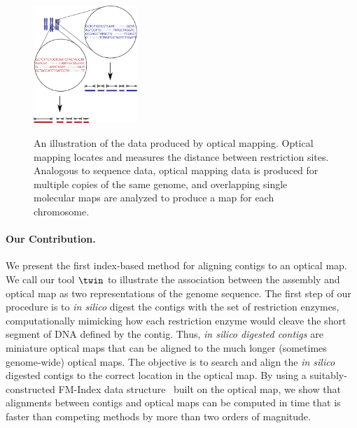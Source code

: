 \documentclass[doctor]{thesis}
\begin{document}
 \begin{figure}
   \centering
   \caption{An illustration of the data produced by optical mapping. Optical mapping locates and measures the distance between restriction sites.  Analogous to sequence data, optical mapping data is produced for multiple copies of the same genome, and overlapping single molecular maps are analyzed to produce a map for each chromosome.  } 
   \includegraphics[width=0.35\textwidth]{./research_exam/slides/ormpub.eps}
   \label{figure:fig1}
 \end{figure}



\paragraph{Our Contribution.}
We present the first index-based method for aligning contigs to an optical map.  
We call our tool $\twin$ to illustrate the association between the assembly and optical map as two representations of the genome sequence.  The first step of our procedure is to {\em in silico} digest the contigs with the set of restriction enzymes, computationally mimicking how each restriction enzyme would cleave the short segment of DNA defined by the contig.  Thus, {\em in silico digested contigs} are miniature optical maps that can be aligned to the much longer (sometimes genome-wide) optical maps.  The objective is to search and align the {\em in silico} digested contigs to the correct location in the optical map. 
By using a suitably-constructed FM-Index data structure~\cite{fm2005} built on the optical map,  we show that alignments between contigs and optical maps can be computed in time that is faster 
than competing methods by more than two orders of magnitude.  
\end{document}
